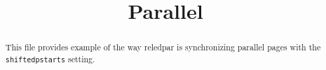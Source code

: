 \documentclass{article}
\begin{document}
\date{}
\title{Parallel}
\maketitle

\begin{abstract}
This file provides example of the way reledpar is synchronizing parallel pages with the \verb+shiftedpstarts+ setting.
\end{abstract}


\begin{pages}
    \begin{Leftside}
        \beginnumbering
           \autopar
           \Blindtext[20][2]
        \endnumbering
    \end{Leftside}
    \begin{Rightside}
        \beginnumbering
            \autopar
           \Blindtext[20][3]
        \endnumbering
    \end{Rightside}

\end{pages} 
\Pages
\end{document}
